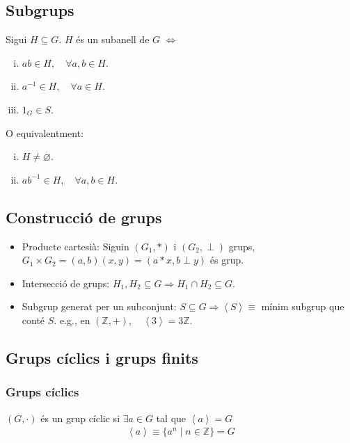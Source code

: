 \subsection{Subgrups}
Sigui $H \subseteq G$. $H$ és un subanell de $G$ $\Leftrightarrow$
\begin{enumerate}[i)]
    \item $ab \in H, \quad \forall a,b \in H$.
    \item $a^{-1} \in H, \quad \forall a \in H$.
    \item $1_{G} \in S$.
\end{enumerate}
O equivalentment:
\begin{enumerate}[i)]
    \item $H \neq \varnothing$.
    \item $ab^{-1} \in H, \quad \forall a,b \in H$.
\end{enumerate}

\subsection{Construcció de grups}
\begin{itemize}
    \item Producte cartesià:
        \subitem Siguin $( G_{1} , \ast)$ i $( G_{2} , \perp )$ grups,
        \subitem $G_{1} \times G_{2} = (a,b) (x,y) = (a \ast x , b \perp y)$ és grup.
    \item Intersecció de grups:
        \subitem $H_{1}, H_{2} \subseteq G \Rightarrow H_{1} \cap H_{2} \subseteq G$.
    \item Subgrup generat per un subconjunt:
        \subitem $S \subseteq G \Rightarrow \left< S \right> \equiv$ mínim subgrup que conté $S$. 
        \subitem e.g., en $(\mathbb{Z} , +), \quad \left< 3 \right> = 3 \mathbb{Z}$.
\end{itemize}

\subsection{Grups cíclics i grups finits}
\subsubsection*{Grups cíclics}
$( G , \cdot )$ és un grup cíclic si $\exists a \in G$ tal que $\left< a \right> = G$ 
\begin{align}
    \left< a \right> \equiv \{ a^{n} \mid n \in \mathbb{Z} \} = G
\end{align}

